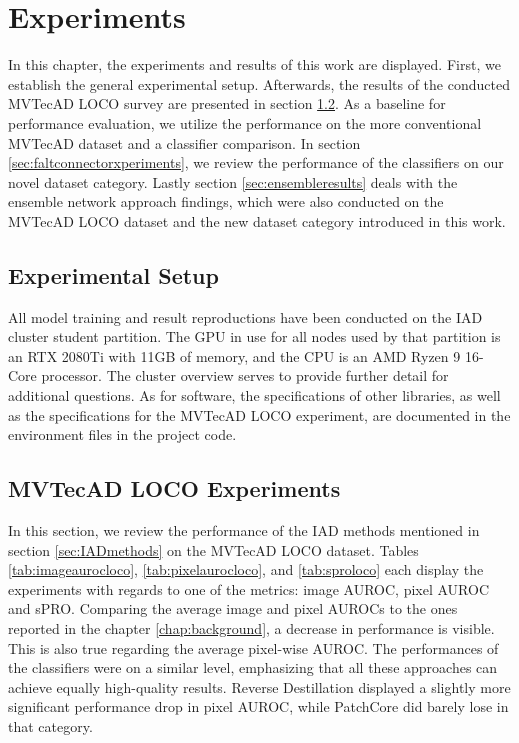 \chapter{Experiments}
\label{chap:experiments}

In this chapter, the experiments and results of this work are displayed. First, we establish the general experimental setup. Afterwards, the results of the conducted MVTecAD LOCO \cite{LOCODentsAndScratchesBergmann2022}
survey are presented in section \ref{sec:locoxperiments}. As a baseline for performance evaluation, we utilize the performance on the more conventional MVTecAD dataset \cite{MVTEC_Bergmann_2021} and a classifier comparison. In section \ref{sec:faltconnectorxperiments}, we review the performance of the classifiers on our novel dataset category. Lastly section \ref{sec:ensembleresults} 
deals with the ensemble network approach findings, which were also conducted on the MVTecAD LOCO dataset and the new dataset category introduced in this work.


\section{Experimental Setup}
\label{sec:experimentsetup}

All model training and result reproductions have been conducted on the IAD cluster student partition. The GPU in use for all nodes used by that partition is an 
RTX 2080Ti with 11GB of memory, and the CPU is an AMD Ryzen 9 16-Core processor. The cluster overview \cite{clusterdocs} serves to provide further detail for additional questions. 
As for software, the specifications of other libraries, as well as the specifications for the MVTecAD LOCO experiment, are documented in the 
environment files in the project code.



\section{MVTecAD LOCO Experiments}
\label{sec:locoxperiments}

In this section, we review the performance of the IAD methods mentioned in section \ref{sec:IADmethods} on the MVTecAD LOCO \cite{LOCODentsAndScratchesBergmann2022} 
dataset. Tables \ref{tab:imageaurocloco}, \ref{tab:pixelaurocloco}, and \ref{tab:sproloco} each display the experiments with regards to one of the metrics: image AUROC, pixel AUROC and sPRO. \newline
Comparing the average image and pixel AUROCs to the ones reported in the chapter \ref{chap:background}, a decrease in performance is visible. 
This is also true regarding the average pixel-wise AUROC. The performances of the classifiers were on a similar level, emphasizing that all these approaches can achieve equally high-quality results. Reverse Destillation \cite{revdist2023} displayed a slightly more significant performance drop in pixel AUROC, while PatchCore \cite{patchCore2022} 
did barely lose in that category.

